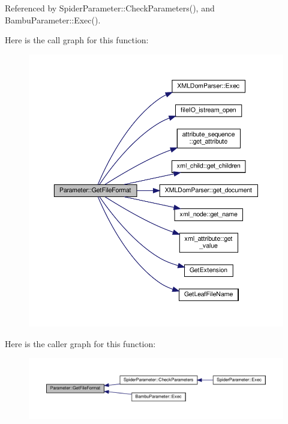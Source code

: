 Referenced by Spider\+Parameter\+::\+Check\+Parameters(), and Bambu\+Parameter\+::\+Exec().

Here is the call graph for this function\+:
\nopagebreak
\begin{figure}[H]
\begin{center}
\leavevmode
\includegraphics[width=350pt]{dc/dab/classParameter_aee7d58cc4376bd4d41fc634bddb459a3_cgraph}
\end{center}
\end{figure}
Here is the caller graph for this function\+:
\nopagebreak
\begin{figure}[H]
\begin{center}
\leavevmode
\includegraphics[width=350pt]{dc/dab/classParameter_aee7d58cc4376bd4d41fc634bddb459a3_icgraph}
\end{center}
\end{figure}
\mbox{\label{classParameter_ab9dec6e5f2b9176dee378c7103f9796d}} 
